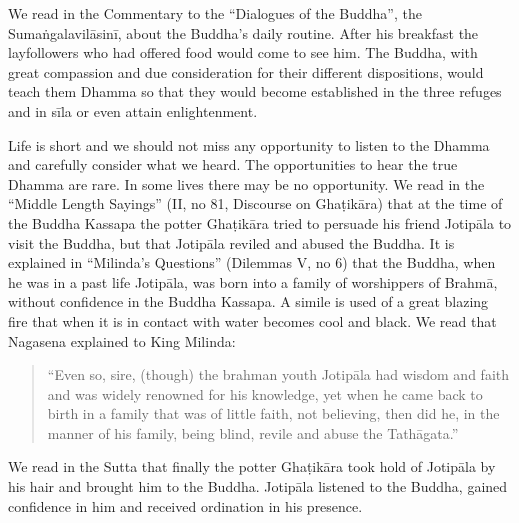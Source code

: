 We read in the Commentary to the ``Dialogues of the Buddha'', the Sumaṅgalavilāsinī, about the Buddha’s daily routine. After his breakfast the layfollowers who had offered food would come to see him. The Buddha, with great compassion and due consideration for their different dispositions, would teach them Dhamma so that they would become established in the three refuges and in sīla or even attain enlightenment.

Life is short and we should not miss any opportunity to listen to the Dhamma and carefully consider what we heard. The opportunities to hear the true Dhamma are rare. In some lives there may be no opportunity. We read in the ``Middle Length Sayings'' (II, no 81, Discourse on Ghaṭikāra) that at the time of the Buddha Kassapa the potter Ghaṭikāra tried to persuade his friend Jotipāla to visit the Buddha, but that Jotipāla reviled and abused the Buddha. It is explained in ``Milinda’s Questions'' (Dilemmas V, no 6) that the Buddha, when he was in a past life Jotipāla, was born into a family of worshippers of Brahmā, without confidence in the Buddha Kassapa. A simile is used of a great blazing fire that when it is in contact with water becomes cool and black. We read that Nagasena explained to King Milinda:

\begin{quote}
``Even so, sire, (though) the brahman youth Jotipāla had wisdom and faith and was widely renowned for his knowledge, yet when he came back to birth in a family that was of little faith, not believing, then did he, in the manner of his family, being blind, revile and abuse the Tathāgata.''
\end{quote}

We read in the Sutta that finally the potter Ghaṭikāra took hold of Jotipāla by his hair and brought him to the Buddha. Jotipāla listened to the Buddha, gained confidence in him and received ordination in his presence.

